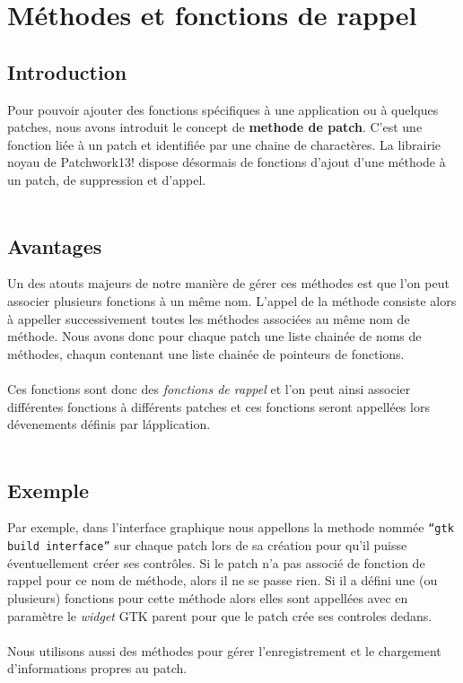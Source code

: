 \chapter{M\'ethodes et fonctions de rappel}

\section{Introduction}

Pour pouvoir ajouter des fonctions sp\'ecifiques \`a une application
ou \`a quelques patches, nous avons introduit le concept de
{\bf methode de patch}. C'est une fonction li\'ee \`a un patch et
identifi\'ee par une chaine de charact\`eres.
La librairie noyau de Patchwork13! dispose d\'esormais de fonctions
d'ajout d'une m\'ethode \`a un patch, de suppression et d'appel.\\
\\

\section{Avantages}

Un des atouts majeurs de notre mani\`ere de g\'erer ces m\'ethodes
est que l'on peut associer plusieurs fonctions \`a un m\^eme nom.
L'appel de la m\'ethode consiste alors \`a appeller successivement
toutes les m\'ethodes associ\'ees au m\^eme nom de m\'ethode.
Nous avons donc pour chaque patch une liste chain\'ee de noms de m\'ethodes,
chaqun contenant une liste chain\'ee de pointeurs de fonctions.\\
\\
Ces fonctions sont donc des {\em fonctions de rappel} et l'on peut ainsi
associer diff\'erentes fonctions \`a diff\'erents patches et ces
fonctions seront appell\'ees lors d\'evenements d\'efinis par
 l\'application.\\
\\

\section{Exemple}

Par exemple, dans l'interface graphique nous appellons la methode
nomm\'ee {\tt ``gtk build interface''} sur chaque patch lors de sa cr\'eation
pour qu'il puisse \'eventuellement cr\'eer ses contr\^oles.
Si le patch n'a pas associ\'e de fonction de rappel pour ce nom de 
m\'ethode, alors il ne se passe rien. Si il a d\'efini une (ou plusieurs)
fonctions pour cette m\'ethode alors elles sont appell\'ees avec en
param\`etre le {\em widget} GTK parent pour que le patch cr\'ee ses controles
dedans.\\
\\
Nous utilisons aussi des m\'ethodes pour g\'erer l'enregistrement
et le chargement d'informations propres au patch.\\
\\

